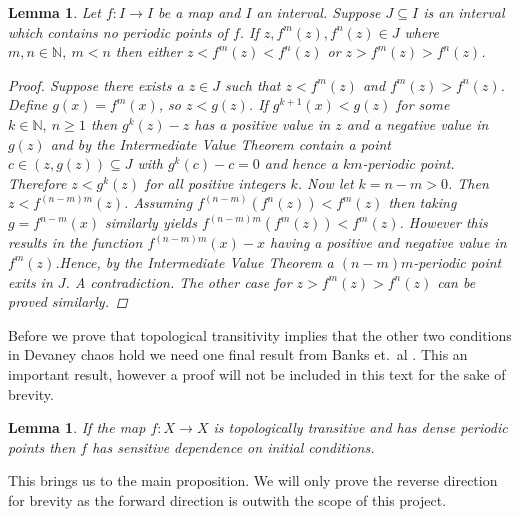 \documentclass[11pt,a4paper,oneside]{memoir}
\theoremstyle{plain}
\newtheorem{lem}[thm]{Lemma}
\theoremstyle{definition}
\begin{document}
\begin{lem} \label{lem:noperiodic}
    Let $f: I \to I$ be a map and $I$ an interval. Suppose $J \subseteq I$ is an interval which contains no periodic points of $f$. If $z, f^m(z), f^n(z) \in J$ where $m, n \in \mathbb{N}, \ m < n$ then either $z < f^m(z) < f^n(z)$ or $z > f^m(z) > f^n(z)$.
    \begin{proof}
        Suppose there exists a $z \in J$ such that $z < f^m(z)$ and $f^m(z) > f^n(z)$. Define $g(x) = f^m(x)$, so $z < g(z)$. If $g^{k+1}(x) < g(z)$ for some $k \in \mathbb{N}, \ n \geq 1$ then $g^k(z) - z$ has a positive value in $z$ and a negative value in $g(z)$ and by the Intermediate Value Theorem contain a point $c \in (z, g(z)) \subseteq J$ with $g^k(c) - c = 0$ and hence a $km$-periodic point. Therefore $z < g^k(z)$ for all positive integers $k$. Now let $k = n - m > 0$. Then $z < f^{(n - m)m}(z)$. Assuming $f^{(n-m)}(f^n(z)) < f^m(z)$ then taking $g = f^{n-m}(x)$ similarly yields $f^{(n-m)m}(f^m(z)) < f^m(z)$. However this results in the function $f^{(n-m)m}(x) - x$ having a positive and negative value in $f^m(z)$.Hence, by the Intermediate Value Theorem a $(n-m)m$-periodic point exits in $J$. A contradiction. The other case for $z > f^m(z) > f^n(z)$ can be proved similarly.
    \end{proof}
\end{lem}

Before we prove that topological transitivity implies that the other two conditions in Devaney chaos hold we need one final result from Banks et.\ al \cite{bbcds}. This an important result, however a proof will not be included in this text for the sake of brevity.

\begin{lem} \label{lem:implies-sdic}
    If the map $f: X \to X$ is topologically transitive and has dense periodic points then $f$ has sensitive dependence on initial conditions.
\end{lem}

This brings us to the main proposition. We will only prove the reverse direction for brevity as the forward direction is outwith the scope of this project.
\end{document}

